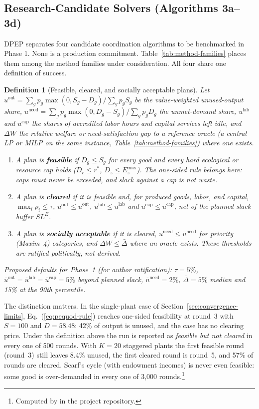 \documentclass[10pt,twoside,openany]{book}
\theoremstyle{dpepstyle}
\newtheorem{definition}{Definition}[chapter]
\begin{document}
\subsection{Research-Candidate Solvers (Algorithms 3a--3d)}
\label{sec:alg3}
DPEP separates four candidate coordination algorithms to be benchmarked in Phase 1. None is a production commitment. Table~\ref{tab:method-families} places them among the method families under consideration. All four share one definition of success.

\begin{definition}[Feasible, cleared, and socially acceptable plans]\label{def:success}
Let $u^{\text{out}} = \sum_g p_g \max(0, S_g - D_g) / \sum_g p_g S_g$ be the value-weighted \emph{unused-output share}, $u^{\text{need}} = \sum_g p_g \max(0, D_g - S_g) / \sum_g p_g D_g$ the \emph{unmet-demand share}, $u^{\text{lab}}$ and $u^{\text{cap}}$ the shares of accredited labor hours and capital services left idle, and $\Delta W$ the relative welfare or need-satisfaction gap to a reference oracle (a central LP or MILP on the same instance, Table~\ref{tab:method-families}) where one exists.
\begin{enumerate}[leftmargin=1.6em,itemsep=1pt]
  \item A plan is \textbf{feasible} if $D_g \le S_g$ for every good and every hard ecological or resource cap holds ($D_r \le r^*$, $D_z \le E_z^{\max}$). The one-sided rule belongs here: caps must never be exceeded, and slack against a cap is not waste.
  \item A plan is \textbf{cleared} if it is feasible and, for produced goods, labor, and capital, $\max_i \rho_i \le \tau$, $u^{\text{out}} \le \bar u^{\text{out}}$, $u^{\text{lab}} \le \bar u^{\text{lab}}$ and $u^{\text{cap}} \le \bar u^{\text{cap}}$, net of the planned slack buffer $SL^E$.
  \item A plan is \textbf{socially acceptable} if it is cleared, $u^{\text{need}} \le \bar u^{\text{need}}$ for priority (Maxim~4) categories, and $\Delta W \le \bar{\Delta}$ where an oracle exists. These thresholds are ratified politically, not derived.
\end{enumerate}
Proposed defaults for Phase~1 (for author ratification): $\tau = 5\%$, $\bar u^{\text{out}} = \bar u^{\text{lab}} = \bar u^{\text{cap}} = 5\%$ beyond planned slack, $\bar u^{\text{need}} = 2\%$, $\bar\Delta = 5\%$ median and 15\% at the 90th percentile.
\end{definition}

The distinction matters. In the single-plant case of Section~\ref{sec:convergence-limits}, Eq.~(\ref{eq:pequod-rule}) reaches one-sided feasibility at round~3 with $S=100$ and $D=58.48$: 42\% of output is unused, and the case has no clearing price. Under the definition above the run is reported as \emph{feasible but not cleared} in every one of 500 rounds. With $K=20$ staggered plants the first feasible round (round~3) still leaves 8.4\% unused, the first cleared round is round~5, and 57\% of rounds are cleared. Scarf's cycle (with endowment incomes) is never even feasible: some good is over-demanded in every one of 3,000 rounds.\footnote{Computed by  in the project repository.}
\end{document}
